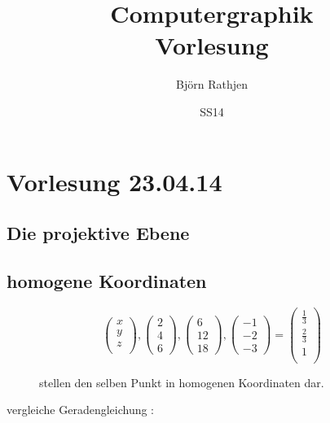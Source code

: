 \documentclass[11pt]{article}
\title{Computergraphik\\Vorlesung}
\author{Björn Rathjen}
\date{SS14}
\begin{document}
\maketitle
\newpage\tableofcontents

\section{Vorlesung 23.04.14}
\subsection{Die projektive Ebene}
\subsection{homogene Koordinaten}
\begin{figure}[!hb]
\begin{minipage}[c]{8cm}
$$ 
\begin{pmatrix}
x \\ y \\ z \\
\end{pmatrix},
\begin{pmatrix}
2 \\ 4 \\ 6
\end{pmatrix},
\begin{pmatrix}
6 \\ 12 \\ 18 
\end{pmatrix},
\begin{pmatrix}
-1 \\ -2 \\ -3 
\end{pmatrix} =
\begin{pmatrix}
\frac{1}{3}\\ \frac{2}{3} \\ 1 \\
\end{pmatrix}
$$
\end{minipage}
\begin{minipage}[c]{6cm}
stellen den selben Punkt in homogenen Koordinaten dar.
\end{minipage}
\end{figure}
vergleiche Geradengleichung :
\end{document}
